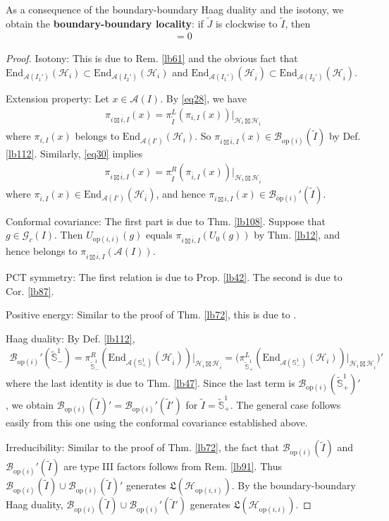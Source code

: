 \documentclass[11pt,b5paper,notitlepage]{article}
\theoremstyle{definition}
\theoremstyle{plain}
\newcommand{\fk}{\mathfrak}
\newcommand{\wtd}{\widetilde}
\newcommand{\ovl}{\overline}
\newcommand{\End}{\mathrm{End}} %
\newcommand{\Sbb}{{\mathbb S}}
\newcommand{\Gc}{\mathscr G_c}
\newcommand{\MA}{\mathcal A}
\newcommand{\MH}{\mathcal H}
\newcommand{\Std}{\widetilde {\mathbb S}^1}
\newcommand{\Bopi}{\mathcal B_{\mathrm{op}(i)}}
\newcommand{\Hopii}{\mathcal H_{\mathrm{op}(i,i)}}
\newcommand{\opii}{\mathrm{op}(i,i)}
\numberwithin{equation}{section}
\begin{document}
As a consequence of the boundary-boundary Haag duality and the isotony, we obtain the \textbf{boundary-boundary locality}: if $\wtd J$ is clockwise to $\wtd I$, then
\begin{align*}
[\Bopi(\wtd I),\Bopi'(\wtd J)]=0
\end{align*}

\begin{proof}
Isotony: This is due to Rem. \ref{lb61} and the obvious fact that $\End_{\MA(I_1')}(\MH_i)\subset \End_{\MA(I_2')}(\MH_i)$ and $\End_{\MA(I_1')}(\MH_{\ovl i})\subset \End_{\MA(I_2')}(\MH_{\ovl i})$.

Extension property: Let $x\in\MA(I)$. By \eqref{eq28}, we have
\begin{align*}
\pi_{i\boxtimes\ovl i,I}(x)=\pi^L_{\wtd I}(\pi_{i,I}(x))\big|_{\MH_i\boxtimes\MH_{\ovl i}}
\end{align*}
where $\pi_{i,I}(x)$ belongs to $\End_{\MA(I')}(\MH_i)$. So $\pi_{i\boxtimes\ovl i,I}(x)\in\Bopi(\wtd I)$ by Def. \ref{lb112}. Similarly, \eqref{eq30} implies
\begin{align*}
\pi_{i\boxtimes\ovl i,I}(x)=\pi^R_{\wtd I}(\pi_{\ovl i,I}(x))\big|_{\MH_i\boxtimes\MH_{\ovl i}}
\end{align*}
where $\pi_{\ovl i,I}(x)\in\End_{\MA(I')}(\MH_{\ovl i})$, and hence $\pi_{i\boxtimes\ovl i,I}(x)\in\Bopi'(\wtd I)$.

Conformal covariance: The first part is due to Thm. \ref{lb108}. Suppose that $g\in\Gc(I)$. Then $U_{\opii}(g)$ equals $\pi_{i\boxtimes\ovl i,I}(U_0(g))$ by Thm. \ref{lb12}, and hence belongs to $\pi_{i\boxtimes\ovl i,I}(\MA(I))$.

PCT symmetry: The first relation is due to Prop. \ref{lb42}. The second is due to Cor. \ref{lb87}.

Positive energy: Similar to the proof of Thm. \ref{lb72}, this is due to \cite{Wei06}.

Haag duality: By Def. \ref{lb112},
\begin{align*}
\Bopi'(\Std_-)=\pi^R_{\Std_-}(\End_{\MA(\Sbb^1_+)}(\MH_{\ovl i}))\big|_{\MH_i\boxtimes\MH_{\ovl i}}=\Big(\pi^L_{\Std_+}(\End_{\MA(\Sbb^1_-)}(\MH_i))\big|_{\MH_i\boxtimes\MH_{\ovl i}}\Big)'
\end{align*}
where the last identity is due to Thm. \ref{lb47}. Since the last term is $\Bopi(\Std_+)'$, we obtain $\Bopi(\wtd I)'=\Bopi'(\wtd I')$ for $\wtd I=\Std_+$. The general case follows easily from this one using the conformal covariance established above.

Irreducibility: Similar to the proof of Thm. \ref{lb72}, the fact that $\Bopi(\wtd I)$ and $\Bopi'(\wtd I)$ are type III factors follows from Rem. \ref{lb91}. Thus $\Bopi(\wtd I)\cup\Bopi(\wtd I)'$ generates $\fk L(\Hopii)$. By the boundary-boundary Haag duality, $\Bopi(\wtd I)\cup\Bopi'(\wtd I')$ generates $\fk L(\Hopii)$.
\end{proof}
\end{document}
